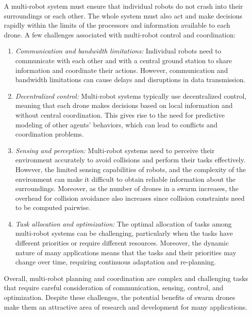 A multi-robot system must ensure that individual robots do not crash into their surroundings or each other. The whole system must also act and make decisions rapidly within the limits of the processors and information available to each drone. A few challenges associated with multi-robot control and coordination:

\begin{enumerate}
    \item \textit{Communication and bandwidth limitations:} Individual robots need to communicate with each other and with a central ground station to share information and coordinate their actions. However, communication and bandwidth limitations can cause delays and disruptions in data transmission. 

    \item \textit{Decentralized control:} Multi-robot systems typically use decentralized control, meaning that each drone makes decisions based on local information and without central coordination. This gives rise to the need for predictive modeling of other agents' behaviors, which can lead to conflicts and coordination problems.

    \item \textit{Sensing and perception:} Multi-robot systems need to perceive their environment accurately to avoid collisions and perform their tasks effectively. However, the limited sensing capabilities of robots, and the complexity of the environment can make it difficult to obtain reliable information about the surroundings. Moreover, as the number of drones in a swarm increases, the overhead for collision avoidance also increases since collision constraints need to be computed pairwise.

    \item \textit{Task allocation and optimization:} The optimal allocation of tasks among multi-robot systems can be challenging, particularly when the tasks have different priorities or require different resources. Moreover, the dynamic nature of many applications means that the tasks and their priorities may change over time, requiring continuous adaptation and re-planning.
    
\end{enumerate}

Overall, multi-robot planning and coordination are complex and challenging tasks that require careful consideration of communication, sensing, control, and optimization. Despite these challenges, the potential benefits of swarm drones make them an attractive area of research and development for many applications.

